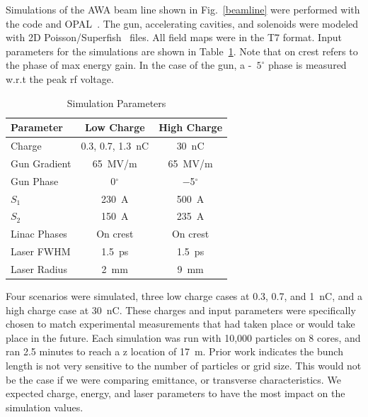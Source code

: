 Simulations of the AWA beam line shown in Fig.~\ref{beamline}
were performed with the code and OPAL~\cite{opal}.
The gun, accelerating cavities, and solenoids were modeled with 2D
Poisson/Superfish~\cite{fish} files. All field maps were in the T7 format.
Input parameters for the simulations are shown in Table~\ref{simparam}.
Note that on crest refers to the phase of max energy gain.
In the case of the gun, a -~$5^{\circ}$ phase is measured 
w.r.t the peak rf voltage.
\begin{table}[hbt]
	\centering
	\caption{Simulation Parameters}
	\begin{tabular}{lcc}
		\toprule
		\textbf{Parameter} & \textbf{Low Charge}  & \textbf{High Charge} \\
		\midrule
		Charge       & 0.3, 0.7, \SI{1.3}{nC}        & \SI{30}{nC}    \\ %
		Gun Gradient & \SI{65}{MV/m}     & \SI{65}{MV/m}  \\ %
		Gun Phase    & \SI{0}{}$^{\circ}$ & \SI{-5}{}$^{\circ}$ \\		 
		$S_1$        & \SI{230}{A}		 & \SI{500}{A}	  \\
		$S_2$		 & \SI{150}{A}   	 & \SI{235}{A}		 \\
		Linac Phases & On crest          & On crest       \\
		Laser FWHM   & \SI{1.5}{ps}      & \SI{1.5}{ps}   \\ %
		Laser Radius & \SI{2}{mm}        & \SI{9}{mm}     \\
		\bottomrule
	\end{tabular}
	\label{simparam}
\end{table}

Four scenarios were simulated, three low charge cases at 0.3, 0.7, and \SI{1}{nC}, and a 
high charge case at \SI{30}{nC}. 
These charges and input parameters were specifically chosen to 
match experimental measurements that had taken place or would 
take place in the future. Each simulation was run with 10,000 particles 
on 8 cores, and ran 2.5 minutes to reach a z location of \SI{17}{m}.
Prior work \cite{benchmark} indicates the bunch length is not 
very sensitive to the number of particles or grid size. 
This would not be the case if we were comparing emittance, or 
transverse characteristics. We expected charge, energy,
and laser parameters to have the most impact on the simulation values.


